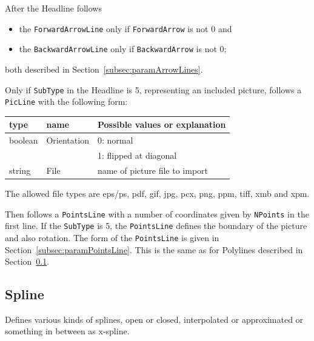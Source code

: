 \documentclass[10pt, a4paper, english]{article}%
\begin{document}
\noindent
After the Headline follows 
%
\begin{itemize}
\item
the \texttt{ForwardArrowLine}  only if \texttt{ForwardArrow}  is not 0 and 
\item
the \texttt{BackwardArrowLine} only if \texttt{BackwardArrow} is not 0; 
\end{itemize}
%
both described in Section~\ref{subsec:paramArrowLines}. 


Only if \texttt{SubType} in the Headline is 5, representing an included picture, 
follows a \texttt{PicLine} with the following form: \\
%
\begin{tabular}{lll}
\toprule
type    & name        & Possible values or explanation \\
\midrule
\midrule
boolean & Orientation & 0: normal \\
        &             & 1: flipped at diagonal \\
string  & File        & name of picture file to import \\
\bottomrule
\end{tabular}

The allowed file types are eps/ps, pdf, gif, jpg, pcx, png, ppm, tiff, xmb and xpm. 

Then follows a \texttt{PointsLine} with a number of coordinates 
given by \texttt{NPoints} in the first line. 
If the \texttt{SubType} is 5, the \texttt{PointsLine} 
defines the boundary of the picture and also rotation. 
The form of the \texttt{PointsLine} is given 
in Section~\ref{subsec:paramPointsLine}. 
This is the same as for Polylines described in Section~\ref{subsec:spline}. 



\subsection{Spline }\label{subsec:spline}

Defines various kinds of splines, 
open or closed, interpolated or approximated or 
something in between as x-spline. 
\end{document}

